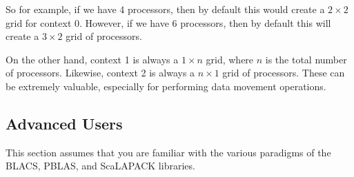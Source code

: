 So for example, if we have 4 processors, then by default this would create a $2\times 2$ grid for context 0.  However, if we have 6 processors, then by default this will create a $3\times 2$ grid of processors.

On the other hand, context 1 is always a $1\times n$ grid, where $n$ is the total number of processors.  Likewise, context 2 is always a $n\times 1$ grid of processors.  These can be extremely valuable, especially for performing data movement operations.




\subsection{Advanced Users}


This section assumes that you are familiar with the various paradigms of the BLACS, PBLAS, and ScaLAPACK libraries.  